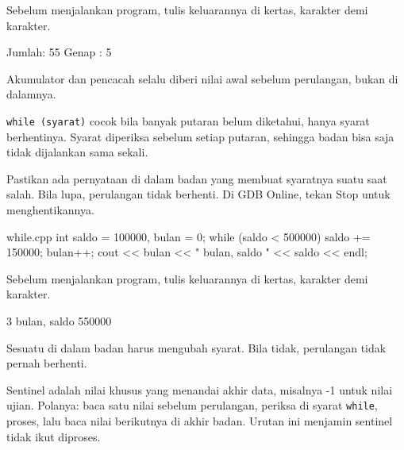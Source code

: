 \documentclass[a4paper]{article}
\begin{document}
\begin{Tebak}[]
Sebelum menjalankan program, tulis keluarannya di kertas, karakter demi karakter.
\end{Tebak}
\begin{Jawaban}[]
\begin{MKeluaran}[]
Jumlah: 55
Genap : 5
\end{MKeluaran}
Akumulator dan pencacah selalu diberi nilai awal sebelum perulangan, bukan di dalamnya.
\end{Jawaban}
\texttt{while (syarat)} cocok bila banyak putaran belum diketahui, hanya syarat berhentinya. Syarat diperiksa sebelum setiap putaran, sehingga badan bisa saja tidak dijalankan sama sekali.

Pastikan ada pernyataan di dalam badan yang membuat syaratnya suatu saat salah. Bila lupa, perulangan tidak berhenti. Di GDB Online, tekan Stop untuk menghentikannya.

\begin{MKode}{while.cpp}
int saldo = 100000, bulan = 0;
while (saldo < 500000) {
    saldo += 150000;
    bulan++;
}
cout << bulan << " bulan, saldo " << saldo << endl;
\end{MKode}
\begin{Tebak}[]
Sebelum menjalankan program, tulis keluarannya di kertas, karakter demi karakter.
\end{Tebak}
\begin{Jawaban}[]
\begin{MKeluaran}[]
3 bulan, saldo 550000
\end{MKeluaran}
Sesuatu di dalam badan harus mengubah syarat. Bila tidak, perulangan tidak pernah berhenti.
\end{Jawaban}
Sentinel adalah nilai khusus yang menandai akhir data, misalnya -1 untuk nilai ujian. Polanya: baca satu nilai sebelum perulangan, periksa di syarat \texttt{while}, proses, lalu baca nilai berikutnya di akhir badan. Urutan ini menjamin sentinel tidak ikut diproses.
\end{document}
